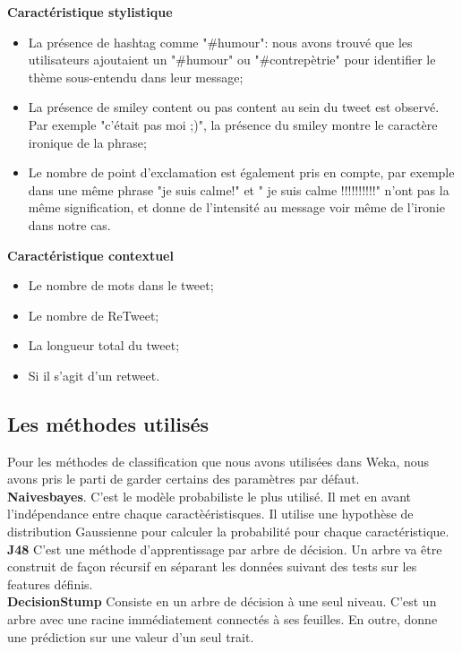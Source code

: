 \documentclass[10pt,a4paper,twoside]{article}
\begin{document}
\textbf{Caractéristique stylistique}
\begin{itemize}
\item La présence de hashtag comme "\#humour": nous avons trouvé que les utilisateurs ajoutaient un "\#humour" ou "\#contrepètrie" pour identifier le thème sous-entendu dans leur message;
\item La présence de smiley content ou pas content au sein du tweet est observé. Par exemple "c'était pas moi ;)", la présence du smiley montre le caractère ironique de la phrase;
\item Le nombre de point d'exclamation est également pris en compte, par exemple dans une même phrase "je suis calme!" et " je suis calme !!!!!!!!!!" n'ont pas la même signification, et donne de l'intensité au message voir même de l'ironie dans notre cas. 
\end{itemize}
\vspace{0.5cm}

\textbf{Caractéristique contextuel}
\begin{itemize}
\item Le nombre de mots dans le tweet;
\item Le nombre de ReTweet;
\item La longueur total du tweet;
\item Si il s'agit d'un retweet.
\end{itemize}
\vspace{0.5cm}

\subsection{Les méthodes utilisés}
\label{methode}
Pour les méthodes de classification que nous avons utilisées dans Weka, nous avons pris le parti de garder certains des paramètres par défaut. \\
\textbf{Naivesbayes}. C'est le modèle probabiliste le plus utilisé. Il met en avant l'indépendance entre chaque caractèéristisques. Il utilise une hypothèse de distribution Gaussienne pour calculer la probabilité pour chaque caractéristique.\\
\textbf{J48} C'est une méthode d'apprentissage par arbre de décision. Un arbre va être construit de façon récursif en séparant les données suivant des tests sur les features définis.  \\
\textbf{DecisionStump} Consiste en un arbre de décision à une seul niveau. C'est un arbre avec une racine immédiatement connectés à ses feuilles. En outre, donne une prédiction sur une valeur d'un seul trait.
\end{document}
